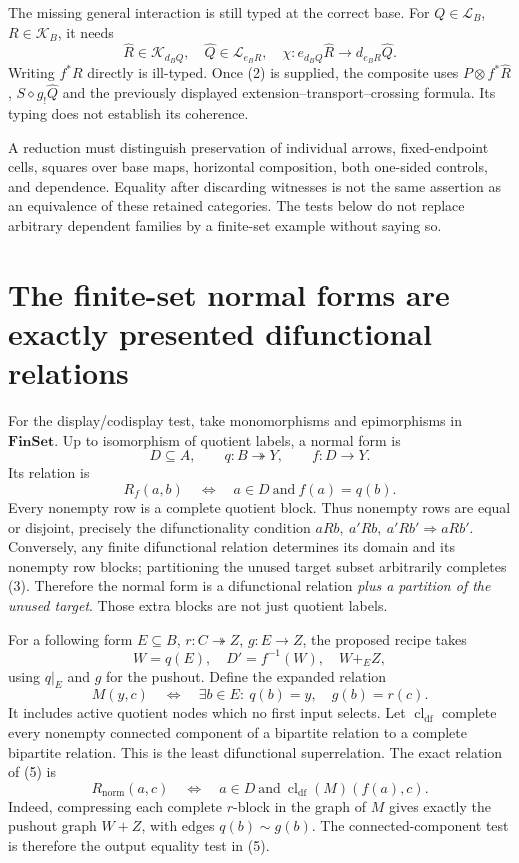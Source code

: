 \documentclass[11pt,a4paper]{article}
\newcommand{\K}{\mathcal K}
\newcommand{\Lcat}{\mathcal L}
\newcommand{\FinSet}{\mathbf{FinSet}}
\newcommand{\cldf}{\operatorname{cl}_{\mathrm{df}}}
\begin{document}
The missing general interaction is still typed at the correct base. For
\(Q\in\Lcat_B\), \(R\in\K_B\), it needs
\[
 \widehat R\in\K_{d_BQ},\quad
 \widehat Q\in\Lcat_{e_BR},\quad
 \chi:e_{d_BQ}\widehat R\to d_{e_BR}\widehat Q.
 \tag{2}
\]
Writing \(f^*R\) directly is ill-typed. Once (2) is supplied, the composite
uses \(P\otimes f^*\widehat R\), \(S\diamond g_!\widehat Q\) and the
previously displayed extension--transport--crossing formula. Its typing does
not establish its coherence.

A reduction must distinguish preservation of individual arrows, fixed-endpoint
cells, squares over base maps, horizontal composition, both one-sided controls,
and dependence. Equality after discarding witnesses is not the same assertion
as an equivalence of these retained categories. The tests below do not replace
arbitrary dependent families by a finite-set example without saying so.

\section{The finite-set normal forms are exactly presented difunctional relations}

For the display/codisplay test, take monomorphisms and epimorphisms in
\(\FinSet\). Up to isomorphism of quotient labels, a normal form is
\[
 D\subseteq A,\qquad q:B\twoheadrightarrow Y,\qquad f:D\to Y.
 \tag{3}
\]
Its relation is
\[
 R_f(a,b)\quad\Longleftrightarrow\quad a\in D\ \text{and}\ f(a)=q(b).
 \tag{4}
\]
Every nonempty row is a complete quotient block. Thus nonempty rows are equal
or disjoint, precisely the difunctionality condition
\(aRb,\ a'Rb,\ a'Rb'\Rightarrow aRb'\).
Conversely, any finite difunctional relation determines its domain and its
nonempty row blocks; partitioning the unused target subset arbitrarily completes
(3). Therefore the normal form is a difunctional relation \emph{plus a partition
of the unused target}. Those extra blocks are not just quotient labels.

For a following form \(E\subseteq B\), \(r:C\twoheadrightarrow Z\),
\(g:E\to Z\), the proposed recipe takes
\[
 W=q(E),\quad D'=f^{-1}(W),\quad W+_EZ,
 \tag{5}
\]
using \(q|_E\) and \(g\) for the pushout. Define the expanded relation
\[
 M(y,c)\quad\Longleftrightarrow\quad
 \exists b\in E:\ q(b)=y,\quad g(b)=r(c).
\]
It includes active quotient nodes which no first input selects. Let
\(\cldf\) complete every nonempty connected component of a bipartite relation
to a complete bipartite relation. This is the least difunctional superrelation.
The exact relation of (5) is
\[
 R_{\mathrm{norm}}(a,c)
 \quad\Longleftrightarrow\quad
 a\in D\ \text{and}\ \cldf(M)(f(a),c).
 \tag{6}
\]
Indeed, compressing each complete \(r\)-block in the graph of \(M\) gives
exactly the pushout graph \(W+Z\), with edges \(q(b)\sim g(b)\).
The connected-component test is therefore the output equality test in (5).
\end{document}
